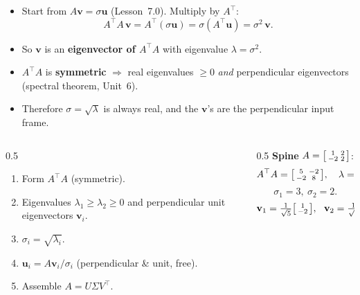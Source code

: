 \documentclass[aspectratio=169, 11pt]{beamer}
\newcommand{\uu}{\mathbf{u}}
\newcommand{\vv}{\mathbf{v}}
\newcommand{\T}{^{\top}}
\begin{document}
\begin{frame}[t, plain]
  \burgundyheader{Why $A\T A$ --- the engine}
  \begin{itemize}
    \setlength{\itemsep}{6pt}
    \item Start from $A\vv=\sigma\uu$ (Lesson~7.0). Multiply by $A\T$:
          \[ A\T A\,\vv = A\T(\sigma\uu) = \sigma(A\T\uu) = \sigma^2\,\vv. \]
    \item So $\vv$ is an \textbf{eigenvector of $A\T A$} with eigenvalue $\lambda=\sigma^2$.
    \item $A\T A$ is \textbf{symmetric} $\Rightarrow$ real eigenvalues $\ge0$ \emph{and} perpendicular
          eigenvectors (spectral theorem, Unit~6).
    \item Therefore $\sigma=\sqrt{\lambda}$ is always real, and the $\vv$'s are the perpendicular input frame.
  \end{itemize}
\end{frame}

\begin{frame}[t, plain]
  \begin{columns}[T]
    \begin{column}{0.5\textwidth}
      \begin{enumerate}
        \setlength{\itemsep}{5pt}
        \item Form $A\T A$ (symmetric).
        \item Eigenvalues $\lambda_1\ge\lambda_2\ge0$ and perpendicular unit eigenvectors $\vv_i$.
        \item $\sigma_i=\sqrt{\lambda_i}$.
        \item $\uu_i=A\vv_i/\sigma_i$ (perpendicular \& unit, free).
        \item Assemble $A=U\Sigma V\T$.
      \end{enumerate}
    \end{column}
    \begin{column}{0.5\textwidth}
      \textbf{Spine} $A=\begin{bsmallmatrix} 1 & 2\\ -2 & 2 \end{bsmallmatrix}$:
      \[ A\T A=\begin{bsmallmatrix} 5 & -2\\ -2 & 8 \end{bsmallmatrix},\quad \lambda=9,4. \]
      \[ \sigma_1=3,\ \sigma_2=2. \]
      \[ \vv_1=\tfrac1{\sqrt5}\begin{bsmallmatrix} 1\\-2 \end{bsmallmatrix},\ \
         \vv_2=\tfrac1{\sqrt5}\begin{bsmallmatrix} 2\\1 \end{bsmallmatrix}. \]
    \end{column}
  \end{columns}
\end{frame}
\end{document}
